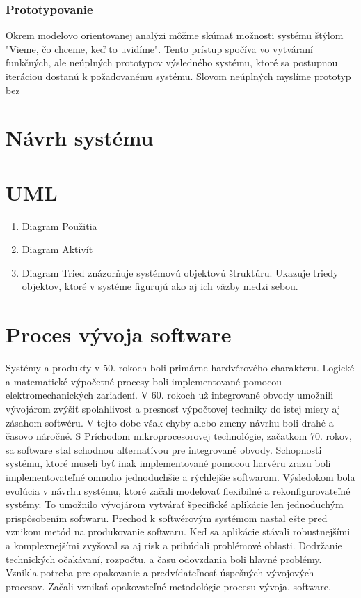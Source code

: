 \subsubsection{Prototypovanie}
Okrem modelovo orientovanej analýzi môžme skúmať možnosti systému štýlom "Vieme, čo chceme, keď to uvidíme". Tento prístup spočíva vo vytváraní funkčných, ale neúplných prototypov výsledného systému, ktoré sa postupnou iteráciou dostanú k požadovanému systému. Slovom neúplných myslíme prototyp bez 
 
  


\section{Návrh systému}


\section{UML}
\begin{enumerate}
	\item Diagram Použitia
	\item Diagram Aktivít
	\item Diagram Tried znázorňuje systémovú objektovú štruktúru. Ukazuje triedy objektov, ktoré v systéme figurujú ako aj ich väzby medzi sebou.
\end{enumerate}

\section{Proces vývoja software}
Systémy a produkty v 50. rokoch boli primárne hardvérového charakteru. Logické a matematické výpočetné procesy boli implementované pomocou elektromechanických zariadení. V 60. rokoch už integrované obvody umožnili vývojárom zvýšiť spolahlivosť a presnosť výpočtovej techniky do istej miery aj zásahom softwéru. V tejto dobe však chyby alebo zmeny návrhu boli drahé a časovo náročné.
S Príchodom mikroprocesorovej technológie, začatkom 70. rokov, sa software stal schodnou alternatívou pre integrované obvody. Schopnosti systému, ktoré museli byť inak implementované pomocou harvéru zrazu boli implementovateľné omnoho jednoduchšie a rýchlejšie softwarom. Výsledokom bola evolúcia v návrhu systému, ktoré začali modelovať flexibilné a rekonfigurovateľné systémy.\cite{wasson2006system} To umožnilo vývojárom vytvárať špecifické aplikácie len jednoduchým prispôsobením softwaru.
Prechod k softwérovým systémom nastal ešte pred vznikom metód na produkovanie softwaru. Keď sa aplikácie stávali robustnejšími a komplexnejšími zvyšoval sa aj risk a pribúdali problémové oblasti. Dodržanie technických očakávaní, rozpočtu, a času odovzdania boli hlavné problémy. Vznikla potreba pre opakovanie a predvídateľnosť úspešných vývojových procesov. Začali vznikať opakovateľné metodológie procesu vývoja. software.
